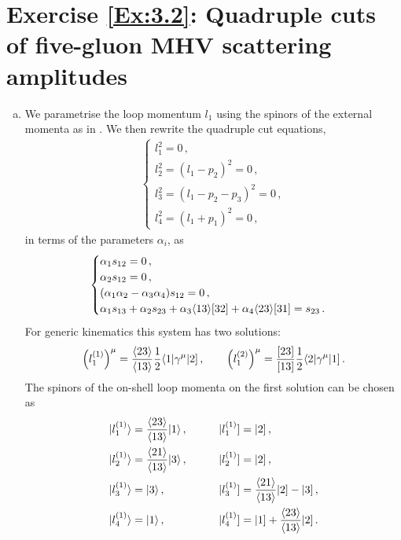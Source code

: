 \section*{Exercise \ref{Ex:3.2}: Quadruple cuts of five-gluon MHV scattering amplitudes}
\label{Sol:3.2}
%
\begin{enumerate}[a)]
\item We parametrise the loop momentum $l_1$ using the spinors of the external momenta as in . We then rewrite the quadruple cut equations,
\begin{align}
\begin{cases} l_1^2 = 0 \,, \\
l_2^2 = (l_1-p_2)^2 = 0  \,, \\
l_3^2 = (l_1-p_2-p_3)^2 = 0 \,, \\
l_4^2 = (l_1+p_1)^2 = 0 \,,
\end{cases}
\end{align}
in terms of the parameters $\alpha_i$, as
\begin{align}
\begin{cases} \alpha_1 s_{12} = 0 \,, \\
\alpha_2 s_{12} = 0 \,, \\
(\alpha_1 \alpha_2-\alpha_3 \alpha_4)s_{12} = 0 \,, \\
\alpha_1 s_{13} + \alpha_2 s_{23} + \alpha_3 \langle 1 3 \rangle [ 3 2 ] + \alpha_4 \langle 2 3 \rangle [ 3 1 ] = s_{23} \,.
\end{cases}
\end{align}
For generic kinematics this system has two solutions:
\begin{align}
\left(l_1^{(1)}\right)^{\mu} = \frac{\langle 2 3 \rangle}{\langle 1 3 \rangle} \frac{1}{2} \langle 1 | \gamma^{\mu} | 2 ] \,, \qquad 
\left(l_1^{(2)}\right)^{\mu} = \frac{[ 2 3 ]}{[ 1 3 ]} \frac{1}{2} \langle 2 | \gamma^{\mu} | 1 ] \,.
\end{align}
The spinors of the on-shell loop momenta on the first solution can be chosen as
\begin{align} \label{eq:l1solSpinors}
\begin{alignedat}{2}
 & |l_1^{(1)} \r> =  \frac{\spA23}{\spA13} |1\r> \,, \qquad \quad && |l_1^{(1)}] = |2] \,, \\
 & |l_2^{(1)} \r> = \frac{\spA21}{\spA13} |3\r> \,, && |l_2^{(1)}] = |2] \,, \\
 & |l_3^{(1)} \r> = |3\r>  \,, && |l_3^{(1)}] = \frac{\spA21}{\spA13} |2] - |3] \,, \\
 & |l_4^{(1)} \r> = |1\r> \,, && |l_4^{(1)}] = |1] + \frac{\spA23}{\spA13} |2] \,.

\end{alignedat}
\end{align}
\end{enumerate}
